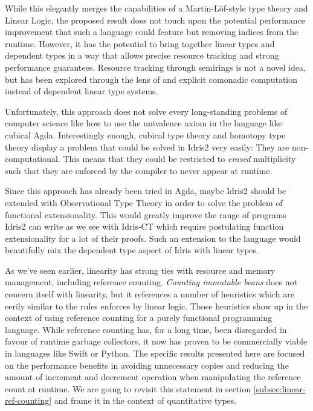\documentclass[
]{article}
\begin{document}
While this elegantly merges the capabilities of a Martin-Löf-style type
theory\cite{martin-lof} and Linear Logic\cite{linear-logic}, the
proposed result does not touch upon the potential performance
improvement that such a language could feature but removing indices from
the runtime\cite{store_indices}. However, it has the potential to bring
together linear types and dependent types in a way that allows precise
resource tracking and strong performance guarantees. Resource tracking
through semirings is not a novel idea, but has been explored through the
lens of and explicit comonadic computation \cite{parametric_effects}
instead of dependent linear type systems.

Unfortunately, this approach does not solve every long-standing problems
of computer science like how to use the univalence axiom in the language
like cubical Agda\cite{cubical_agda}. Interestingly enough, cubical type
theory and homotopy type theory display a problem that could be solved
in Idris2 very easily: They are non-computational. This means that they
could be restricted to \emph{erased} multiplicity such that they are
enforced by the compiler to never appear at runtime.

Since this approach has already been tried in Agda\cite{agda}, maybe
Idris2 should be extended with Observational Type Theory \cite{ott} in
order to solve the problem of functional extensionality. This would
greatly improve the range of programs Idris2 can write as we see with
Idris-CT\cite{idris-ct} which require postulating function
extensionality for a lot of their proofs. Such an extension to the
language would beautifully mix the dependent type aspect of Idris with
linear types.

As we've seen earlier, linearity has strong ties with resource and
memory management, including reference counting. \emph{Counting
immutable beans}\cite{immutable_beans} does not concern itself with
linearity, but it references a number of heuristics which are eerily
similar to the rules enforces by linear logic. Those heuristics show up
in the context of using reference counting for a purely functional
programming language. While reference counting has, for a long time,
been disregarded in favour of runtime garbage collectors, it now has
proven to be commercially viable in languages like Swift or Python. The
specific results presented here are focused on the performance benefits
in avoiding unnecessary copies and reducing the amount of increment and
decrement operation when manipulating the reference count at runtime. We
are going to revisit this statement in section
\ref{subsec:linear-ref-counting} and frame it in the context of
quantitative types.
\end{document}
